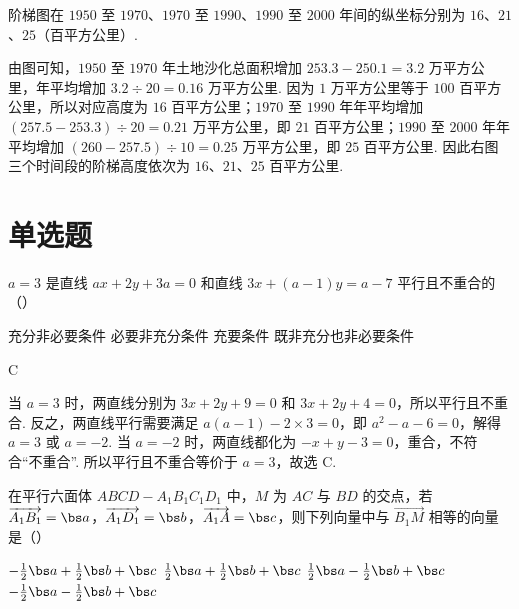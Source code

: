 \begin{answer}
阶梯图在 \(1950\) 至 \(1970\)、\(1970\) 至 \(1990\)、\(1990\) 至 \(2000\) 年间的纵坐标分别为 \(16\)、\(21\)、\(25\)（百平方公里）.
\end{answer}

\begin{solution}
由图可知，\(1950\) 至 \(1970\) 年土地沙化总面积增加 \(253.3-250.1=3.2\) 万平方公里，年平均增加 \(3.2\div20=0.16\) 万平方公里. 因为 \(1\) 万平方公里等于 \(100\) 百平方公里，所以对应高度为 \(16\) 百平方公里；\(1970\) 至 \(1990\) 年年平均增加 \((257.5-253.3)\div20=0.21\) 万平方公里，即 \(21\) 百平方公里；\(1990\) 至 \(2000\) 年年平均增加 \((260-257.5)\div10=0.25\) 万平方公里，即 \(25\) 百平方公里. 因此右图三个时间段的阶梯高度依次为 \(16\)、\(21\)、\(25\) 百平方公里.
\end{solution}

\section{单选题}
\begin{problem}
\(a=3\) 是直线 \(ax+2y+3a=0\) 和直线 \(3x+(a-1)y=a-7\) 平行且不重合的（\quad）

\choices
    {充分非必要条件}
    {必要非充分条件}
    {充要条件}
    {既非充分也非必要条件}
\end{problem}

\begin{answer}
C
\end{answer}

\begin{solution}
当 \(a=3\) 时，两直线分别为 \(3x+2y+9=0\) 和 \(3x+2y+4=0\)，所以平行且不重合. 反之，两直线平行需要满足 \(a(a-1)-2\times3=0\)，即 \(a^2-a-6=0\)，解得 \(a=3\) 或 \(a=-2\). 当 \(a=-2\) 时，两直线都化为 \(-x+y-3=0\)，重合，不符合“不重合”. 所以平行且不重合等价于 \(a=3\)，故选 C.
\end{solution}

\begin{problem}
在平行六面体 \(ABCD-A_1B_1C_1D_1\) 中，\(M\) 为 \(AC\) 与 \(BD\) 的交点，若 \(\overrightarrow{A_1B_1}=\bs a\)，\(\overrightarrow{A_1D_1}=\bs b\)，\(\overrightarrow{A_1A}=\bs c\)，则下列向量中与 \(\overrightarrow{B_1M}\) 相等的向量是（\quad）

\choices
    {\(-\frac12\bs a+\frac12\bs b+\bs c\)}
    {\(\frac12\bs a+\frac12\bs b+\bs c\)}
    {\(\frac12\bs a-\frac12\bs b+\bs c\)}
    {\(-\frac12\bs a-\frac12\bs b+\bs c\)}
\end{problem}

